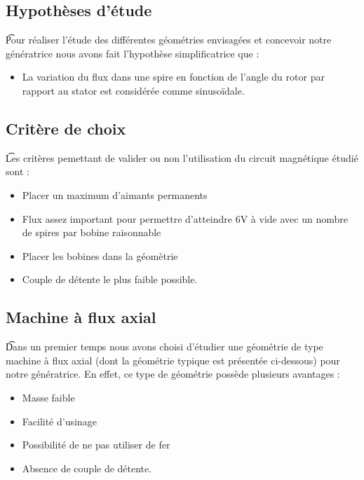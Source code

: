\documentclass[a4paper,12pt]{article} %
\begin{document}
\subsection{Hypothèses d'étude}


\t Pour réaliser l'étude des différentes géométries envisagées et concevoir notre génératrice nous avons fait l'hypothèse simplificatrice que :
\begin{itemize}
\item La variation du flux dans une spire en fonction de l'angle du rotor par rapport au stator est considérée comme sinusoïdale.
\end{itemize}

\subsection{Critère de choix}
\t Les critères pemettant de valider ou non l'utilisation du circuit magnétique étudié sont :

\begin{itemize}
\item Placer un maximum d'aimants permanents
\item Flux assez important pour permettre d'atteindre 6V à vide avec un nombre de spires par bobine raisonnable
\item Placer les bobines dans la géomètrie
\item Couple de détente le plus faible possible.
\end{itemize}

\subsection{Machine à flux axial}

\t Dans un premier temps nous avons choisi d'étudier une géométrie de type machine à flux axial (dont la géométrie typique est présentée ci-dessous) pour notre génératrice. En effet, ce type de géométrie possède plusieurs avantages :

\begin{itemize}
\item Masse faible
\item Facilité d'usinage
\item Possibilité de ne pas utiliser de fer
\item Absence de couple de détente.
\end{itemize}
\end{document}
